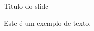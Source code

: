 \documentclass{beamer}
\title{\raggedright\fontfamily{phv}\selectfont{\color{black}\textls[200]{\uppercase{Título da apresentação}}}}
\author{\raggedright\fontfamily{phv}\selectfont{\color{black}\textls[200]{\uppercase{Vinícius Barros Rodrigues \\ \vspace*{0.2cm} Universidade Federal de Viçosa \\ \vspace*{0.7cm} \texttt{\lowercase{\textls[10]{viniciusbrbio@gmail.com}}}}}}}
\date{}
\begin{document}
\begin{frame}

\maketitle

 
\end{frame}

\begin{frame}{Titulo do slide}

Este é um exemplo de texto.

\end{frame}
\end{document}
